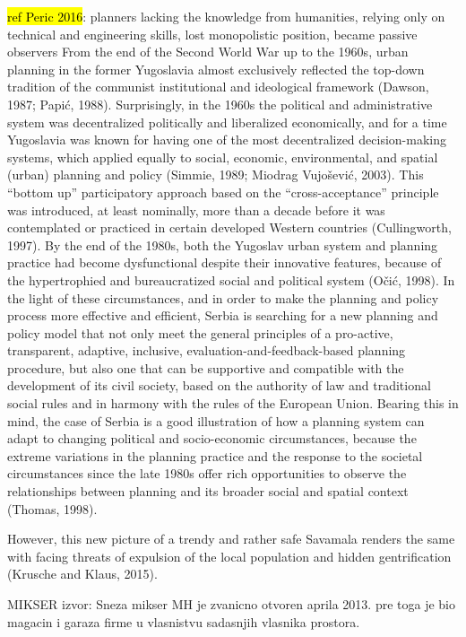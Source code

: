 \documentclass[11pt]{report}
\begin{document}
\hl{ref Peric 2016}: 
planners lacking the knowledge from humanities, relying only on technical and engineering skills, lost monopolistic position, became passive observers
From the end of the Second World War up to the 1960s, urban planning in the former Yugoslavia almost exclusively reflected the top-down tradition of the communist institutional and ideological framework (Dawson, 1987; Papić, 1988). Surprisingly, in the 1960s the political and administrative system was decentralized politically and liberalized economically, and for a time Yugoslavia was known for having one of the most decentralized decision-making systems, which applied equally to social, economic, environmental, and spatial (urban) planning and policy (Simmie, 1989; Miodrag Vujošević, 2003). This “bottom up” participatory approach based on the “cross-acceptance” principle was introduced, at least nominally, more than a decade before it was contemplated or practiced in certain developed Western countries (Cullingworth, 1997). By the end of the 1980s, both the Yugoslav urban system and planning practice had become dysfunctional despite their innovative features, because of the hypertrophied and bureaucratized social and political system (Očić, 1998).
In the light of these circumstances, and in order to make the planning and policy process more effective and efficient, Serbia is searching for a new planning and policy model that not only meet the general principles of a pro-active, transparent, adaptive, inclusive, evaluation-and-feedback-based planning procedure, but also one that can be supportive and compatible with the development of its civil society, based on the authority of law and traditional social rules and in harmony with the rules of the European Union.
Bearing this in mind, the case of Serbia is a good illustration of how a planning system can adapt to changing political and socio-economic circumstances, because the extreme variations in the planning practice and the response to the societal circumstances since the late 1980s offer rich opportunities to observe the relationships between planning and its broader social and spatial context (Thomas, 1998).

However, this new picture of a trendy and rather safe Savamala renders the same with facing threats of expulsion of the local population and hidden gentrification (Krusche and Klaus, 2015). 

MIKSER
izvor: Sneza mikser
MH je zvanicno otvoren aprila 2013. 
pre toga je bio magacin i garaza firme u vlasnistvu sadasnjih vlasnika prostora. 
\end{document}
